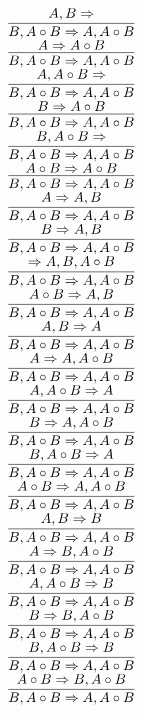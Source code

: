 \documentclass[11pt]{article}
\begin{document}
\begin{center}
\bigskip
\\$\infer{B, A\circ B\Rightarrow A, A\circ B}{A, B\Rightarrow }$
\bigskip
\\$\infer{B, A\circ B\Rightarrow A, A\circ B}{A\Rightarrow A\circ B}$
\bigskip
\\$\infer{B, A\circ B\Rightarrow A, A\circ B}{A, A\circ B\Rightarrow }$
\bigskip
\\$\infer{B, A\circ B\Rightarrow A, A\circ B}{B\Rightarrow A\circ B}$
\bigskip
\\$\infer{B, A\circ B\Rightarrow A, A\circ B}{B, A\circ B\Rightarrow }$
\bigskip
\\$\infer{B, A\circ B\Rightarrow A, A\circ B}{A\circ B\Rightarrow A\circ B}$
\bigskip
\\$\infer{B, A\circ B\Rightarrow A, A\circ B}{A\Rightarrow A, B}$
\bigskip
\\$\infer{B, A\circ B\Rightarrow A, A\circ B}{B\Rightarrow A, B}$
\bigskip
\\$\infer{B, A\circ B\Rightarrow A, A\circ B}{\Rightarrow A, B, A\circ B}$
\bigskip
\\$\infer{B, A\circ B\Rightarrow A, A\circ B}{A\circ B\Rightarrow A, B}$
\bigskip
\\$\infer{B, A\circ B\Rightarrow A, A\circ B}{A, B\Rightarrow A}$
\bigskip
\\$\infer{B, A\circ B\Rightarrow A, A\circ B}{A\Rightarrow A, A\circ B}$
\bigskip
\\$\infer{B, A\circ B\Rightarrow A, A\circ B}{A, A\circ B\Rightarrow A}$
\bigskip
\\$\infer{B, A\circ B\Rightarrow A, A\circ B}{B\Rightarrow A, A\circ B}$
\bigskip
\\$\infer{B, A\circ B\Rightarrow A, A\circ B}{B, A\circ B\Rightarrow A}$
\bigskip
\\$\infer{B, A\circ B\Rightarrow A, A\circ B}{A\circ B\Rightarrow A, A\circ B}$
\bigskip
\\$\infer{B, A\circ B\Rightarrow A, A\circ B}{A, B\Rightarrow B}$
\bigskip
\\$\infer{B, A\circ B\Rightarrow A, A\circ B}{A\Rightarrow B, A\circ B}$
\bigskip
\\$\infer{B, A\circ B\Rightarrow A, A\circ B}{A, A\circ B\Rightarrow B}$
\bigskip
\\$\infer{B, A\circ B\Rightarrow A, A\circ B}{B\Rightarrow B, A\circ B}$
\bigskip
\\$\infer{B, A\circ B\Rightarrow A, A\circ B}{B, A\circ B\Rightarrow B}$
\bigskip
\\$\infer{B, A\circ B\Rightarrow A, A\circ B}{A\circ B\Rightarrow B, A\circ B}$

\end{center}
\end{document}
